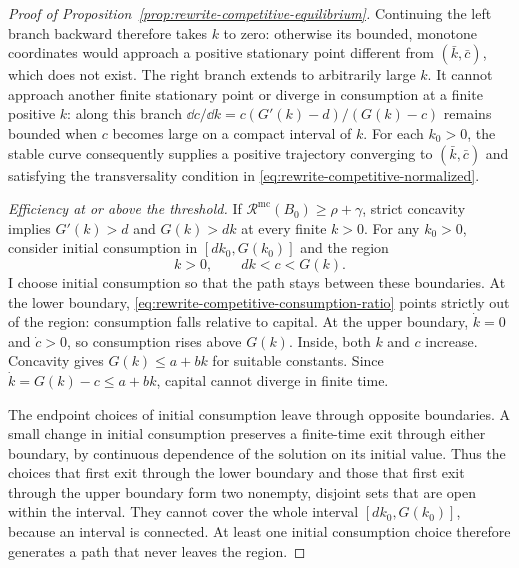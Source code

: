 \begin{proof}[Proof of Proposition~\ref{prop:rewrite-competitive-equilibrium}]
Continuing the left branch backward therefore takes $k$ to zero:
otherwise its bounded, monotone coordinates would approach a positive
stationary point different from $(\bar k,\bar c)$, which does not exist.
The right branch extends to arbitrarily large $k$. It cannot approach
another finite stationary point or diverge in consumption at a finite
positive $k$: along this branch
$\dd c/\dd k=c(G'(k)-d)/(G(k)-c)$ remains bounded when $c$ becomes
large on a compact interval of $k$.
For each $k_0>0$, the stable curve consequently supplies a positive
trajectory converging to $(\bar k,\bar c)$ and satisfying the
transversality condition in \eqref{eq:rewrite-competitive-normalized}.

\emph{Efficiency at or above the threshold.}
If $\mathcal R^{\mathrm{mc}}(B_0)\geq\rho+\gamma$, strict concavity
implies $G'(k)>d$ and $G(k)>dk$ at every finite $k>0$.
For any $k_0>0$, consider initial consumption in
$[dk_0,G(k_0)]$ and the region
\[
 k>0,\qquad dk<c<G(k).
\]
I choose initial consumption so that the path stays between these
boundaries. At the lower boundary,
\eqref{eq:rewrite-competitive-consumption-ratio} points strictly out
of the region: consumption falls relative to capital. At the upper
boundary, $\dot k=0$ and $\dot c>0$, so consumption rises above $G(k)$.
Inside, both $k$ and $c$
increase. Concavity gives $G(k)\leq a+bk$ for suitable constants.
Since $\dot k=G(k)-c\leq a+bk$, capital cannot diverge in finite time.

The endpoint choices of initial consumption leave through opposite
boundaries. A small change in initial consumption preserves a finite-time
exit through either boundary, by continuous dependence of the solution
on its initial value. Thus the choices that first exit through the lower
boundary and those that first exit through the upper boundary form two
nonempty, disjoint sets that are open within the interval. They cannot cover
the whole interval
$[dk_0,G(k_0)]$, because an interval is connected. At least one initial
consumption choice therefore generates a path that never leaves the
region.


\end{proof}
